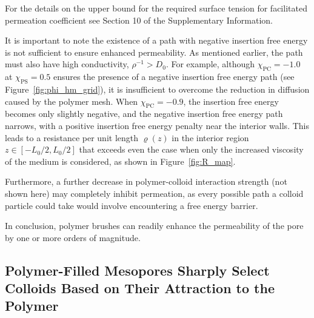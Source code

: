 \documentclass[12pt, a4paper]{article}
\begin{document}
For the details on the upper bound for the required surface tension for facilitated permeation coefficient see
Section 10 of the Supplementary Information.

It is important to note the existence of a path with negative insertion free energy is not sufficient to ensure enhanced permeability.
As mentioned earlier, the path must also have high conductivity, $\rho^{-1} > D_0$.
For example, although $\chi_{\text{PC}} = -1.0$ at $\chi_{\text{PS}} = 0.5$ ensures the presence of a negative insertion free energy path (see Figure~\ref{fig:phi_hm_grid}), it is insufficient to overcome the reduction in diffusion caused by the polymer mesh.
When $\chi_{\text{PC}} = -0.9$, the insertion free energy becomes only slightly negative, and the negative insertion free energy path narrows, with a positive insertion free energy penalty near the interior walls. 
This leads to a resistance per unit length $\varrho(z)$ in the interior region $z \in [-L_{0}/2, L_{0}/2]$ that exceeds even the case when only the increased viscosity of the medium is considered, as shown in Figure~\ref{fig:R_map}.

Furthermore, a further decrease in polymer-colloid interaction strength (not shown here) may completely inhibit permeation, as every possible path a colloid particle could take would involve encountering a free energy barrier.

In conclusion, polymer brushes can readily enhance the permeability of the pore by one or more orders of magnitude.


\subsection{Polymer-Filled Mesopores Sharply Select Colloids Based on Their Attraction to the Polymer}
\end{document}
